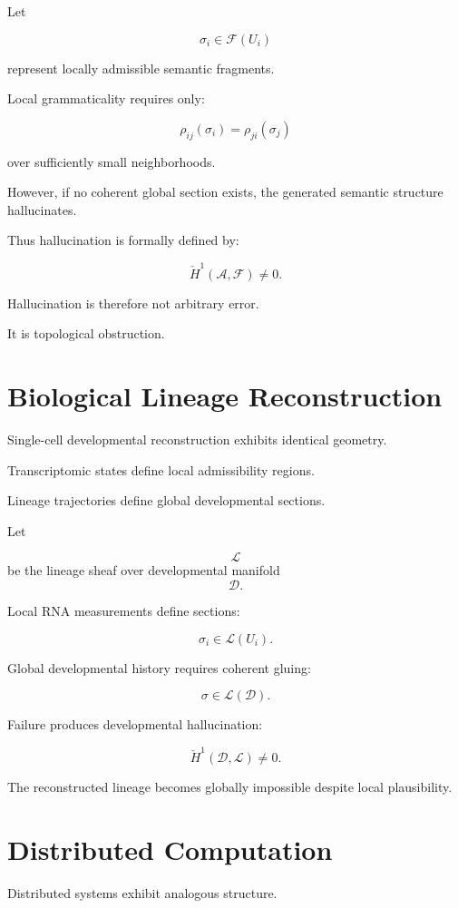 \documentclass[12pt,openany]{book}
\theoremstyle{plain}
\theoremstyle{definition}
\theoremstyle{remark}
\begin{document}
Let

\[
\sigma_i
\in
\mathcal{F}(U_i)
\]

represent locally admissible semantic fragments.

Local grammaticality requires only:

\[
\rho_{ij}(\sigma_i)
=
\rho_{ji}(\sigma_j)
\]

over sufficiently small neighborhoods.

However, if no coherent global section exists, the generated
semantic structure hallucinates.

Thus hallucination is formally defined by:

\[
\check{H}^1(\mathcal{A},\mathcal{F})
\neq
0.
\]

Hallucination is therefore not arbitrary error.

It is topological obstruction.

\section{Biological Lineage Reconstruction}

Single-cell developmental reconstruction exhibits identical
geometry.

Transcriptomic states define local admissibility regions.

Lineage trajectories define global developmental sections.

Let

\[
\mathcal{L}
\]
be the lineage sheaf over developmental manifold
\[
\mathcal{D}.
\]

Local RNA measurements define sections:

\[
\sigma_i
\in
\mathcal{L}(U_i).
\]

Global developmental history requires coherent gluing:

\[
\sigma
\in
\mathcal{L}(\mathcal{D}).
\]

Failure produces developmental hallucination:

\[
\check{H}^1(\mathcal{D},\mathcal{L})
\neq
0.
\]

The reconstructed lineage becomes globally impossible despite
local plausibility.

\section{Distributed Computation}

Distributed systems exhibit analogous structure.
\end{document}

